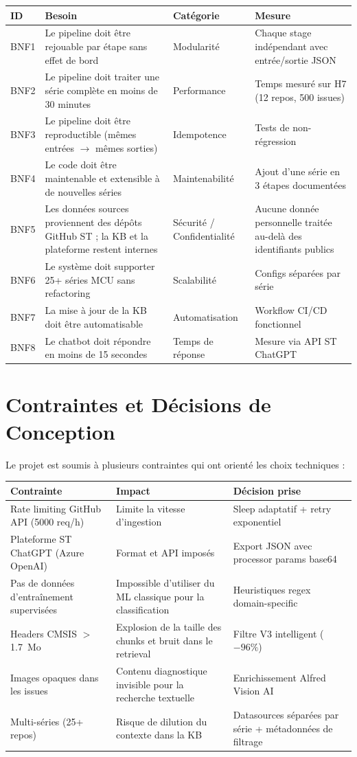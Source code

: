 \documentclass[12pt,a4paper]{report}
\begin{document}
\begin{longtable}{p{1cm}p{4cm}p{3cm}p{5cm}}
\toprule
\textbf{ID} & \textbf{Besoin} & \textbf{Catégorie} & \textbf{Mesure} \\
\midrule
BNF1 & Le pipeline doit être rejouable par étape sans effet de bord & Modularité & Chaque stage indépendant avec entrée/sortie JSON \\
BNF2 & Le pipeline doit traiter une série complète en moins de 30 minutes & Performance & Temps mesuré sur H7 (12 repos, 500 issues) \\
BNF3 & Le pipeline doit être reproductible (mêmes entrées $\to$ mêmes sorties) & Idempotence & Tests de non-régression \\
BNF4 & Le code doit être maintenable et extensible à de nouvelles séries & Maintenabilité & Ajout d'une série en 3 étapes documentées \\
BNF5 & Les données sources proviennent des dépôts GitHub ST ; la KB et la plateforme restent internes & Sécurité / Confidentialité & Aucune donnée personnelle traitée au-delà des identifiants publics \\
BNF6 & Le système doit supporter 25+ séries MCU sans refactoring & Scalabilité & Configs séparées par série \\
BNF7 & La mise à jour de la KB doit être automatisable & Automatisation & Workflow CI/CD fonctionnel \\
BNF8 & Le chatbot doit répondre en moins de 15 secondes & Temps de réponse & Mesure via API ST ChatGPT \\
\bottomrule
\end{longtable}

\section{Contraintes et Décisions de Conception}
\label{sec:contraintes}

Le projet est soumis à plusieurs contraintes qui ont orienté les choix techniques :

\begin{longtable}{p{4cm}p{5cm}p{4cm}}
\toprule
\textbf{Contrainte} & \textbf{Impact} & \textbf{Décision prise} \\
\midrule
Rate limiting GitHub API (5000 req/h) & Limite la vitesse d'ingestion & Sleep adaptatif + retry exponentiel \\
Plateforme ST ChatGPT (Azure OpenAI) & Format et API imposés & Export JSON avec processor params base64 \\
Pas de données d'entraînement supervisées & Impossible d'utiliser du ML classique pour la classification & Heuristiques regex domain-specific \\
Headers CMSIS $>$ 1.7~Mo & Explosion de la taille des chunks et bruit dans le retrieval & Filtre V3 intelligent ($-96\%$) \\
Images opaques dans les issues & Contenu diagnostique invisible pour la recherche textuelle & Enrichissement Alfred Vision AI \\
Multi-séries (25+ repos) & Risque de dilution du contexte dans la KB & Datasources séparées par série + métadonnées de filtrage \\
\bottomrule
\end{longtable}
\end{document}
